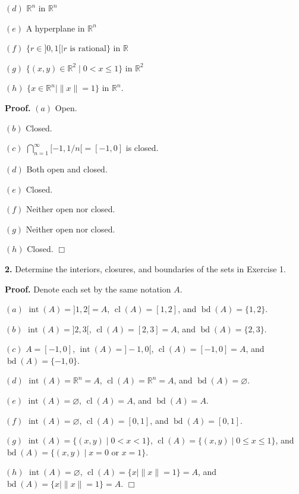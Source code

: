 \documentclass{article}
\begin{document}
$(d)$ $\mathbb{R}^n$ in $\mathbb{R}^n$

$(e)$ A hyperplane in $\mathbb{R}^n$

$(f)$ $\{r\in ]0,1[\mid r \text{ is rational}\}$ in $\mathbb{R}$

$(g)$ $\{(x,y)\in \mathbb{R}^2 \mid 0 < x \le 1\}$ in $\mathbb{R}^2$

$(h)$ $\{x\in \mathbb{R}^n \mid \|x\| = 1\}$ in $\mathbb{R}^n$.

\textbf{Proof.} $(a)$ Open.

$(b)$ Closed.

$(c)$ $\bigcap_{n=1}^{\infty}[-1,1/n[ = [-1,0]$ is closed.

$(d)$ Both open and closed.

$(e)$ Closed.

$(f)$ Neither open nor closed.

$(g)$ Neither open nor closed.

$(h)$ Closed. $\Box$

    \textbf{2.} Determine the interiors, closures, and boundaries of the
sets in Exercise 1.

\textbf{Proof.} Denote each set by the same notation $A$.

$(a)$ $\operatorname{int}(A) = ]1,2[=A$, $\operatorname{cl}(A) = [1,2]$,
and $\operatorname{bd}(A) = \{1,2\}$.

$(b)$ $\operatorname{int}(A) = ]2,3[$, $\operatorname{cl}(A) = [2,3]=A$,
and $\operatorname{bd}(A) = \{2,3\}$.

$(c)$ $A = [-1, 0]$, $\operatorname{int}(A) = ]-1,0[$,
$\operatorname{cl}(A) = [-1,0]=A$, and
$\operatorname{bd}(A) = \{-1,0\}$.

$(d)$ $\operatorname{int}(A) = \mathbb{R}^n=A$,
$\operatorname{cl}(A) = \mathbb{R}^n=A$, and
$\operatorname{bd}(A) = \varnothing$.

$(e)$ $\operatorname{int}(A) = \varnothing$, $\operatorname{cl}(A) = A$,
and $\operatorname{bd}(A) = A$.

$(f)$ $\operatorname{int}(A) = \varnothing$,
$\operatorname{cl}(A) = [0,1]$, and $\operatorname{bd}(A) = [0,1]$.

$(g)$ $\operatorname{int}(A) = \{(x,y)\mid 0< x< 1\}$,
$\operatorname{cl}(A) = \{(x,y)\mid 0\le x\le 1\}$, and
$\operatorname{bd}(A) = \{(x,y)\mid x = 0 \text{ or } x=1\}$.

$(h)$ $\operatorname{int}(A) = \varnothing$,
$\operatorname{cl}(A) = \{x\mid \|x\| = 1\} = A$, and
$\operatorname{bd}(A) = \{x\mid \|x\| = 1\} = A$. $\Box$
\end{document}
